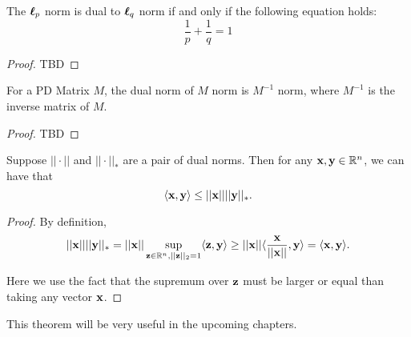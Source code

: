 \documentclass[../main.tex]{subfiles}
\begin{document}
\begin{claim}
	The $\boldsymbol{\ell}_p$ norm is dual to $\boldsymbol{\ell}_q$ norm if and only if the following equation holds:
	\begin{equation}
	\frac{1}{p} + \frac{1}{q} = 1
	\end{equation}
\end{claim}
\begin{proof}
	TBD
\end{proof}

\begin{claim}
	For a PD Matrix $M$, the dual norm of $M$ norm is $M^{-1}$ norm, where $M^{-1}$ is the inverse matrix of $M$.
\end{claim}
\begin{proof}
	TBD
\end{proof}

\begin{theorem}
	Suppose $||\cdot||$ and $||\cdot||_*$ are a pair of dual norms. Then for any $\mathbf{x}, \mathbf{y} \in \mathbb{R}^n$, we can have that 
	\begin{equation}
	\langle\mathbf{x},\mathbf{y}\rangle \leq ||\mathbf{x}|| ||\mathbf{y}||_*.
	\end{equation}
\end{theorem}

\begin{proof}
	By definition, 
	\begin{equation*}
	||\mathbf{x}|| ||\mathbf{y}||_* = ||\mathbf{x}|| \sup\limits_{\mathbf{z} \in \mathbb{R}^n, ||\mathbf{z}||_2 = 1}  \langle \mathbf{z}, \mathbf{y} \rangle \geq ||\mathbf{x}|| \langle \frac{\mathbf{x}}{||\mathbf{x}||}, \mathbf{y} \rangle =  \langle\mathbf{x}, \mathbf{y} \rangle.
	\end{equation*}
	
	Here we use the fact that the supremum over $\mathbf{z}$ must be larger or equal than taking any vector $\mathbf{x}$.
\end{proof}

This theorem will be very useful in the upcoming chapters.
\end{document}
